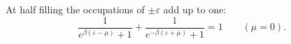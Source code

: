 \documentclass{article}
\begin{document}
At half filling the occupations of $\pm\varepsilon$ add up to one:
\begin{equation}
\frac{1}{e^{\beta(\varepsilon-\mu)}+1} + \frac{1}{e^{-\beta(\varepsilon+\mu)}+1} = 1 \qquad (\mu = 0) .
\label{eq:ph}
\end{equation}
\end{document}
